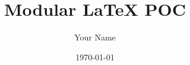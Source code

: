 \newpage

\ClearBackgroundImage
{}

\title{Modular LaTeX POC}
\author{Your Name}
\date{\today}
\maketitle

\ClearBackgroundImage